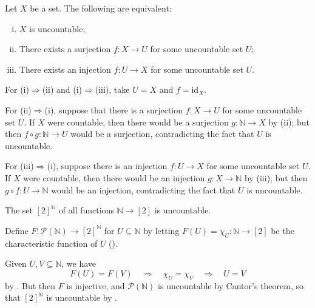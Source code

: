 \begin{theorem}
\label{thmUncountableFromInjSurj}
Let $X$ be a set. The following are equivalent:
\begin{enumerate}[(i)]
\item $X$ is uncountable;
\item \label{testitem} There exists a surjection $f : X \to U$ for some uncountable set $U$;
\item There exists an injection $f : U \to X$ for some uncountable set $U$.
\end{enumerate}
\end{theorem}

\begin{cproof}
For (i)$\Rightarrow$(ii) and (i)$\Rightarrow$(iii), take $U=X$ and $f=\mathrm{id}_X$.

For (ii)$\Rightarrow$(i), suppose that there is a surjection $f : X \to U$ for some uncountable set $U$. If $X$ were countable, then there would be a surjection $g : \mathbb{N} \to X$ by (ii); but then $f \circ g : \mathbb{N} \to U$ would be a surjection, contradicting the fact that $U$ is uncountable.

For (iii)$\Rightarrow$(i), suppose there is an injection $f : U \to X$ for some uncountable set $U$. If $X$ were countable, then there would be an injection $g : X \to \mathbb{N}$ by (iii); but then $g \circ f : U \to \mathbb{N}$ would be an injection, contradicting the fact that $U$ is uncountable.
\end{cproof}

\begin{proposition}
\label{propBinarySequencesAreUncountable}
The set $[2]^{\mathbb{N}}$ of all functions $\mathbb{N} \to [2]$ is uncountable.
\end{proposition}

\begin{cproof}
Define $F : \mathcal{P}(\mathbb{N}) \to [2]^{\mathbb{N}}$ for $U \subseteq \mathbb{N}$ by letting $F(U) = \chi_U : \mathbb{N} \to [2]$ be the characteristic function of $U$ ().

Given $U, V \subseteq \mathbb{N}$, we have
\[ F(U) = F(V) \quad \Rightarrow \quad \chi_U = \chi_V \quad \Rightarrow \quad U = V \]
by . But then $F$ is injective, and $\mathcal{P}(\mathbb{N})$ is uncountable by Cantor's theorem, so that $[2]^{\mathbb{N}}$ is uncountable by .
\end{cproof}


